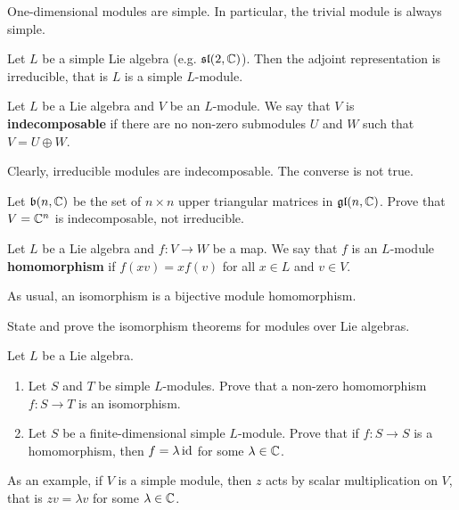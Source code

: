 One-dimensional modules are simple. In particular, 
the trivial module is always simple. 

\begin{example}
    Let $L$ be a simple Lie algebra (e.g. $\mathfrak{sl}(2,\mathbb{C})$). Then 
    the adjoint representation is irreducible, that is $L$ is a simple $L$-module.  
\end{example}

\begin{definition}
    Let $L$ be a Lie algebra and $V$ be an $L$-module. We say 
    that $V$ is \textbf{indecomposable} if 
    there are no non-zero submodules $U$ and $W$ such that
    $V=U\oplus W$.
\end{definition}

Clearly, irreducible modules are indecomposable. 
The converse is not true.


\begin{exercise}
    Let $\mathfrak{b}(n,\mathbb{C})$ be the set of $n\times n$ 
    upper triangular 
    matrices in $\mathfrak{gl}(n,\mathbb{C})$. Prove that $V=\mathbb{C}^n$ is indecomposable,  
    not irreducible. 
\end{exercise}

\begin{definition}
    Let $L$ be a Lie algebra and $f\colon V\to W$ be a map. 
    We say that $f$ is an $L$-module \textbf{homomorphism} if
    $f(xv)=xf(v)$ for all $x\in L$ and $v\in V$. 
\end{definition}

As usual, an isomorphism is a bijective module homomorphism. 

\begin{exercise}
    State and prove the isomorphism theorems for modules
    over Lie algebras. 
\end{exercise}

\begin{exercise}
    Let $L$ be a Lie algebra.
    \begin{enumerate}
        \item Let $S$ and $T$ be simple $L$-modules.
            Prove that a non-zero homomorphism $f\colon S\to T$ 
            is an isomorphism.
        \item Let $S$ be a finite-dimensional simple $L$-module. 
            Prove that if $f\colon S\to S$ is a homomorphism, then
                $f=\lambda\operatorname{id}$ for some $\lambda\in\mathbb{C}$. 
    \end{enumerate} 
\end{exercise}

As an example, if $V$ is a simple module, then $z$
acts by scalar multiplication on $V$, that is
$zv=\lambda v$ for some $\lambda\in\mathbb{C}$. 
